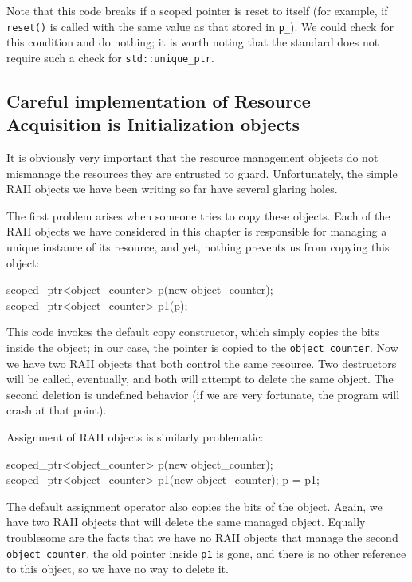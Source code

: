 Note that this code breaks if a scoped pointer is reset to itself (for example, if \texttt{reset()} is called with the same value as that stored in \texttt{p\_}). We could check for this condition and do nothing; it is worth noting that the standard does not require such a check for \texttt{std::unique\_ptr}.

\subsection{Careful implementation of Resource Acquisition is Initialization objects}

It is obviously very important that the resource management objects do not mismanage the resources they are entrusted to guard. Unfortunately, the simple RAII objects we have been writing so far have several glaring holes.

The first problem arises when someone tries to copy these objects. Each of the RAII objects we have considered in this chapter is responsible for managing a unique instance of its resource, and yet, nothing prevents us from copying this object:

\begin{code}
scoped_ptr<object_counter> p(new object_counter);
scoped_ptr<object_counter> p1(p);
\end{code}

This code invokes the default copy constructor, which simply copies the bits inside the object; in our case, the pointer is copied to the \texttt{object\_counter}. Now we have two RAII objects that both control the same resource. Two destructors will be called, eventually, and both will attempt to delete the same object. The second deletion is undefined behavior (if we are very fortunate, the program will crash at that point).

Assignment of RAII objects is similarly problematic:

\begin{code}
scoped_ptr<object_counter> p(new object_counter);
scoped_ptr<object_counter> p1(new object_counter);
p = p1;
\end{code}

The default assignment operator also copies the bits of the object. Again, we have two RAII objects that will delete the same managed object. Equally troublesome are the facts that we have no RAII objects that manage the second \texttt{object\_counter}, the old pointer inside \texttt{p1} is gone, and there is no other reference to this object, so we have no way to delete it.

